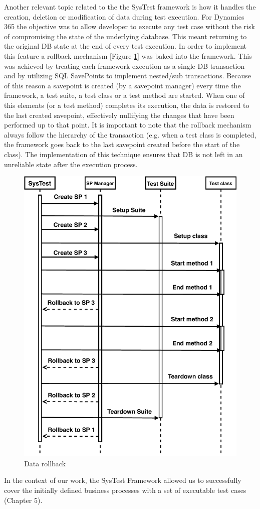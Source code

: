 Another relevant topic related to the the SysTest framework is how it handles the creation, deletion or modification of data during test execution. For Dynamics 365 the objective was to allow developer to execute any test case without the risk of compromising the state of the underlying database. This meant returning to the original DB state at the end of every test execution. In order to implement this feature a rollback mechanism [Figure \ref{fig:SysTestRollback}] was baked into the framework. This was achieved by treating each framework execution as a single DB transaction and by utilizing SQL SavePoints to implement nested/sub transactions. Because of this reason a savepoint is created (by a savepoint manager) every time the framework, a test suite, a test class or a test method are started. When one of this elements (or a test method) completes its execution, the data is restored to the last created savepoint, effectively nullifying the changes that have been performed up to that point. It is important to note that the rollback mechanism always follow the hierarchy of the transaction (e.g. when a test class is completed, the framework goes back to the last savepoint created before the start of the class). The implementation of this technique ensures that DB is not left in an unreliable state after the execution process.

\begin{figure}[ht]
	\centering
	\includegraphics[scale=0.65]{Images/SysTestRollback.pdf}
	\caption{Data rollback }
	\label{fig:SysTestRollback}
\end{figure}

In the context of our work, the SysTest Framework allowed us to successfully cover the initially defined business processes with a set of executable test cases (Chapter 5).
